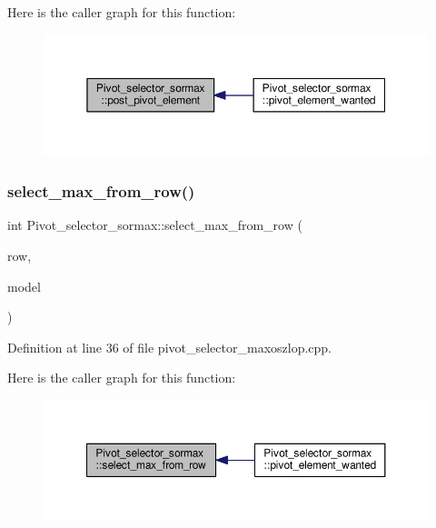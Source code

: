 Here is the caller graph for this function\+:\nopagebreak
\begin{figure}[H]
\begin{center}
\leavevmode
\includegraphics[width=350pt]{classPivot__selector__sormax_a1f19dc653e774ae625a96695469a411c_icgraph}
\end{center}
\end{figure}
\mbox{\label{classPivot__selector__sormax_ae4cc8a14537453cb9bd890500dd72d01}} 
\subsubsection{\texorpdfstring{select\+\_\+max\+\_\+from\+\_\+row()}{select\_max\_from\_row()}}
{\footnotesize\ttfamily int Pivot\+\_\+selector\+\_\+sormax\+::select\+\_\+max\+\_\+from\+\_\+row (\begin{DoxyParamCaption}\item[{int}]{row,  }\item[{Q\+Standard\+Item\+Model $\ast$}]{model }\end{DoxyParamCaption})\hspace{0.3cm}{\ttfamily [private]}}



Definition at line 36 of file pivot\+\_\+selector\+\_\+maxoszlop.\+cpp.

Here is the caller graph for this function\+:\nopagebreak
\begin{figure}[H]
\begin{center}
\leavevmode
\includegraphics[width=350pt]{classPivot__selector__sormax_ae4cc8a14537453cb9bd890500dd72d01_icgraph}
\end{center}
\end{figure}


